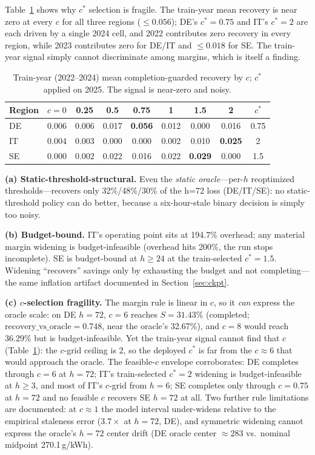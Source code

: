 \documentclass[sigconf,nonacm=false]{acmart}
\begin{document}
Table~\ref{tab:csel} shows why $c^*$ selection is fragile. The train-year mean
recovery is near zero at every $c$ for all three regions ($\le0.056$); DE's
$c^*{=}0.75$ and IT's $c^*{=}2$ are each driven by a single 2024 cell, and 2022
contributes zero recovery in every region, while 2023 contributes zero for DE/IT
and $\le0.018$ for SE. The train-year signal simply
cannot discriminate among margins, which is itself a finding.

\begin{table}[t]
  \caption{Train-year (2022--2024) mean completion-guarded recovery by $c$;
  $c^*$ applied on 2025. The signal is near-zero and noisy.}
  \label{tab:csel}
  \small
  \begin{tabular}{@{}l c c c c c c c c@{}}
    \toprule
    Region & $c{=}0$ & 0.25 & 0.5 & 0.75 & 1 & 1.5 & 2 & $c^*$ \\
    \midrule
    DE & 0.006 & 0.006 & 0.017 & \textbf{0.056} & 0.012 & 0.000 & 0.016 & 0.75 \\
    IT & 0.004 & 0.003 & 0.000 & 0.000 & 0.002 & 0.010 & \textbf{0.025} & 2 \\
    SE & 0.000 & 0.002 & 0.022 & 0.016 & 0.022 & \textbf{0.029} & 0.000 & 1.5 \\
    \bottomrule
  \end{tabular}
\end{table}

\textbf{(a) Static-threshold-structural.} Even the \emph{static oracle}---per-$h$
reoptimized thresholds---recovers only 32\%/48\%/30\% of the h=72 loss
(DE/IT/SE): no static-threshold policy can do better, because a six-hour-stale
binary decision is simply too noisy.

\textbf{(b) Budget-bound.} IT's operating point sits at 194.7\% overhead; any
material margin widening is budget-infeasible (overhead hits 200\%, the run
stops incomplete). SE is budget-bound at $h\ge24$ at the train-selected
$c^*{=}1.5$. Widening ``recovers'' savings only by exhausting the budget and not
completing---the same inflation artifact documented in Section~\ref{sec:ckpt}.

\textbf{(c) $c$-selection fragility.} The margin rule is linear in $c$, so it
\emph{can} express the oracle scale: on DE $h{=}72$, $c{=}6$ reaches
$S{=}31.43\%$ (completed; $\mathrm{recovery\_vs\_oracle}{=}0.748$, near the
oracle's 32.67\%), and $c{=}8$ would reach 36.29\% but is budget-infeasible. Yet
the train-year signal cannot find that $c$ (Table~\ref{tab:csel}): the
$c$-grid ceiling is 2, so the deployed $c^*$ is far from the $c{\approx}6$ that
would approach
the oracle. The feasible-$c$ envelope corroborates: DE completes through
$c{=}6$ at $h{=}72$; IT's train-selected $c^*{=}2$ widening is budget-infeasible
at $h\ge3$, and most of IT's $c$-grid from $h{=}6$; SE completes only through $c{=}0.75$ at $h{=}72$
and no feasible $c$ recovers SE $h{=}72$ at all. Two further rule limitations
are documented: at $c{\approx}1$ the model interval under-widens relative to the
empirical staleness error ($3.7\times$ at $h{=}72$, DE), and symmetric widening
cannot express the oracle's $h{=}72$ center drift (DE oracle center
$\approx283$ vs.\ nominal midpoint 270.1\,g/kWh).
\end{document}
